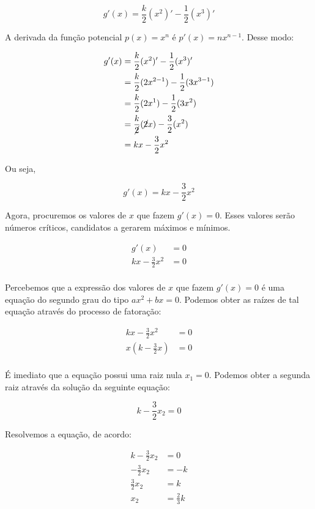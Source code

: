 \documentclass{article}
\begin{document}
\[
    g'(x) = \frac{k}{2}(x^2)' -\frac{1}{2}(x^3)'
\]

A derivada da função potencial \(p(x) = x^n\) é  \(p'(x) = nx^{n-1}\). Desse modo:

\begin{align*}
    g'(x)
     & = \frac{k}{2}(x^2)' -\frac{1}{2}(x^3)'                  \\
     & = \frac{k}{2}(2x^{2-1}) -\frac{1}{2}(3x^{3-1})          \\
     & = \frac{k}{2}(2x^{1}) -\frac{1}{2}(3x^{2})              \\
     & = \frac{k}{\cancel{2}}(\cancel{2}x) -\frac{3}{2}(x^{2}) \\
     & = kx -\frac{3}{2}x^{2}                                  \\
\end{align*}

Ou seja,

\begin{equation}\label{eq:q2_derivative_of_pressure}
    g'(x) = kx -\frac{3}{2}x^{2}
\end{equation}

Agora, procuremos os valores de \(x\) que fazem \(g'(x) = 0\). Esses valores
serão números críticos, candidatos a gerarem máximos e mínimos.

\begin{align*}
    g'(x)
                         & = 0 \\
    kx -\frac{3}{2}x^{2} & = 0 \\
\end{align*}

Percebemos que a expressão dos valores de \(x\) que fazem \(g'(x) = 0\) é
uma equação do segundo grau do tipo \(ax^2 + bx = 0\). Podemos obter as raízes
de tal equação através do processo de fatoração:

\begin{align*}
    kx -\frac{3}{2}x^{2}         & = 0 \\
    x\left(k-\frac{3}{2}x\right) & = 0 \\
\end{align*}

É imediato que a equação possui uma raiz nula \(x_1 = 0\). Podemos obter a segunda
raiz através da solução da seguinte equação:

\[
    k-\frac{3}{2}x_2 = 0
\]

Resolvemos a equação, de acordo:

\begin{align*}
    k-\frac{3}{2}x_2 & = 0            \\
    -\frac{3}{2}x_2  & = -k           \\
    \frac{3}{2}x_2   & = k            \\
    x_2              & = \frac{2}{3}k
\end{align*}
\end{document}
